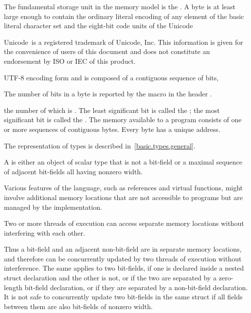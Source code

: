 \pnum
{}%
The fundamental storage unit in the \Cpp{} memory model is the
.
A byte is at least large enough to contain
the ordinary literal encoding of any element of the basic
%
literal character set
and the eight-bit code units of the Unicode
\begin{footnote}
Unicode\textregistered\ is a registered trademark of Unicode, Inc.
This information is given for the convenience of users of this document and
does not constitute an endorsement by ISO or IEC of this product.
\end{footnote}
%
UTF-8 encoding form
and is composed of a contiguous sequence of
bits,
\begin{footnote}
The number of bits in a byte is reported by the macro
 in the header .
\end{footnote}
the number of which is . The least
significant bit is called the ; the most
significant bit is called the . The memory
available to a \Cpp{} program consists of one or more sequences of
contiguous bytes. Every byte has a unique address.

\pnum
\begin{note}
The representation of types is described
in~\ref{basic.types.general}.
\end{note}

\pnum
A  is either an object of scalar type that is not a bit-field
or a maximal sequence of adjacent bit-fields all having nonzero width.
\begin{note}
Various
features of the language, such as references and virtual functions, might
involve additional memory locations that are not accessible to programs but are
managed by the implementation.
\end{note}
Two or more threads of
execution can access separate memory
locations without interfering with each other.

\pnum
\begin{note}
Thus a bit-field and an adjacent non-bit-field are in separate memory
locations, and therefore can be concurrently updated by two threads of execution
without interference. The same applies to two bit-fields, if one is declared
inside a nested struct declaration and the other is not, or if the two are
separated by a zero-length bit-field declaration, or if they are separated by a
non-bit-field declaration. It is not safe to concurrently update two bit-fields
in the same struct if all fields between them are also bit-fields of nonzero
width.
\end{note}

